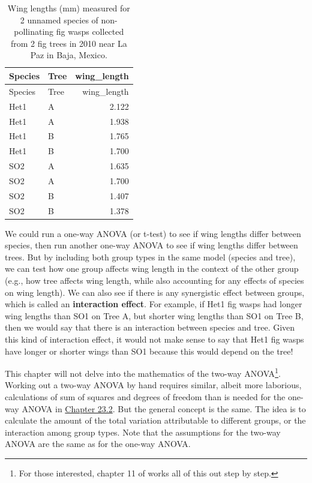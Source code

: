 \documentclass[
]{scrbook}
\begin{document}
\begin{longtable}[]{@{}llr@{}}
\caption{\label{tab:unnamed-chunk-119}Wing lengths (mm) measured for 2 unnamed species of non-pollinating fig wasps collected from 2 fig trees in 2010 near La Paz in Baja, Mexico.}\tabularnewline
\toprule
Species & Tree & wing\_length \\
\midrule
\endfirsthead
\toprule
Species & Tree & wing\_length \\
\midrule
\endhead
Het1 & A & 2.122 \\
Het1 & A & 1.938 \\
Het1 & B & 1.765 \\
Het1 & B & 1.700 \\
SO2 & A & 1.635 \\
SO2 & A & 1.700 \\
SO2 & B & 1.407 \\
SO2 & B & 1.378 \\
\bottomrule
\end{longtable}

We could run a one-way ANOVA (or t-test) to see if wing lengths differ between species, then run another one-way ANOVA to see if wing lengths differ between trees.
But by including both group types in the same model (species and tree), we can test how one group affects wing length in the context of the other group (e.g., how tree affects wing length, while also accounting for any effects of species on wing length).
We can also see if there is any synergistic effect between groups, which is called an \textbf{interaction effect}.
For example, if Het1 fig wasps had longer wing lengths than SO1 on Tree A, but shorter wing lengths than SO1 on Tree B, then we would say that there is an interaction between species and tree.
Given this kind of interaction effect, it would not make sense to say that Het1 fig wasps have longer or shorter wings than SO1 because this would depend on the tree!

This chapter will not delve into the mathematics of the two-way ANOVA\footnote{For those interested, chapter 11 of \citet{Sokal1995} works all of this out step by step.}.
Working out a two-way ANOVA by hand requires similar, albeit more laborious, calculations of sum of squares and degrees of freedom than is needed for the one-way ANOVA in \protect\hyperlink{one-way-anova}{Chapter 23.2}.
But the general concept is the same.
The idea is to calculate the amount of the total variation attributable to different groups, or the interaction among group types.
Note that the assumptions for the two-way ANOVA are the same as for the one-way ANOVA.
\end{document}
